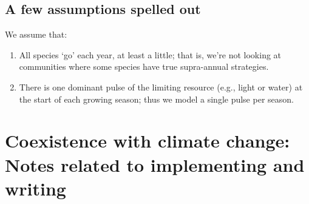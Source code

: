 \documentclass[11pt,a4paper,oneside]{article}
\begin{document}
\subsection{A few assumptions spelled out}
\noindent We assume that:
\begin{enumerate}
\item All species `go' each year, at least a little; that is, we're
  not looking at communities where some species have true
  supra-annual strategies.
\item There is one dominant pulse of the limiting resource (e.g.,
  light or water) at the
  start of each growing season; thus we model a  single pulse per
  season.
\end{enumerate}


\section{Coexistence with climate change: Notes related to implementing and writing}\label{genoutline}
\end{document}
